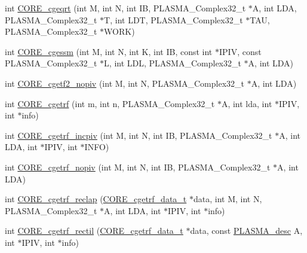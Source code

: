\begin{DoxyCompactItemize}
\item 
int \hyperlink{group__CORE__PLASMA__Complex32__t_gaf5772c310721f743a07d003e0b9b693e_gaf5772c310721f743a07d003e0b9b693e}{C\+O\+R\+E\+\_\+cgeqrt} (int M, int N, int I\+B, P\+L\+A\+S\+M\+A\+\_\+\+Complex32\+\_\+t $\ast$A, int L\+D\+A, P\+L\+A\+S\+M\+A\+\_\+\+Complex32\+\_\+t $\ast$T, int L\+D\+T, P\+L\+A\+S\+M\+A\+\_\+\+Complex32\+\_\+t $\ast$T\+A\+U, P\+L\+A\+S\+M\+A\+\_\+\+Complex32\+\_\+t $\ast$W\+O\+R\+K)
\item 
int \hyperlink{group__CORE__PLASMA__Complex32__t_ga4231da0e918e1dff4a6d270768e4d4dd_ga4231da0e918e1dff4a6d270768e4d4dd}{C\+O\+R\+E\+\_\+cgessm} (int M, int N, int K, int I\+B, const int $\ast$I\+P\+I\+V, const P\+L\+A\+S\+M\+A\+\_\+\+Complex32\+\_\+t $\ast$L, int L\+D\+L, P\+L\+A\+S\+M\+A\+\_\+\+Complex32\+\_\+t $\ast$A, int L\+D\+A)
\item 
int \hyperlink{group__CORE__PLASMA__Complex32__t_ga30476f667dedd4e77048b05c5f99a194_ga30476f667dedd4e77048b05c5f99a194}{C\+O\+R\+E\+\_\+cgetf2\+\_\+nopiv} (int M, int N, P\+L\+A\+S\+M\+A\+\_\+\+Complex32\+\_\+t $\ast$A, int L\+D\+A)
\item 
int \hyperlink{group__CORE__PLASMA__Complex32__t_ga1422c76f05c86e514fe638818a170e5f_ga1422c76f05c86e514fe638818a170e5f}{C\+O\+R\+E\+\_\+cgetrf} (int m, int n, P\+L\+A\+S\+M\+A\+\_\+\+Complex32\+\_\+t $\ast$A, int lda, int $\ast$I\+P\+I\+V, int $\ast$info)
\item 
int \hyperlink{group__CORE__PLASMA__Complex32__t_gafc300bd10ce70d8d864ce0408cc9cd6b_gafc300bd10ce70d8d864ce0408cc9cd6b}{C\+O\+R\+E\+\_\+cgetrf\+\_\+incpiv} (int M, int N, int I\+B, P\+L\+A\+S\+M\+A\+\_\+\+Complex32\+\_\+t $\ast$A, int L\+D\+A, int $\ast$I\+P\+I\+V, int $\ast$I\+N\+F\+O)
\item 
int \hyperlink{group__CORE__PLASMA__Complex32__t_gabd3a609b34e1e5cab320c21cfe5af6ca_gabd3a609b34e1e5cab320c21cfe5af6ca}{C\+O\+R\+E\+\_\+cgetrf\+\_\+nopiv} (int M, int N, int I\+B, P\+L\+A\+S\+M\+A\+\_\+\+Complex32\+\_\+t $\ast$A, int L\+D\+A)
\item 
int \hyperlink{group__CORE__PLASMA__Complex32__t_gaafeafd6a5addac900db7b17527269a6f_gaafeafd6a5addac900db7b17527269a6f}{C\+O\+R\+E\+\_\+cgetrf\+\_\+reclap} (\hyperlink{structCORE__cgetrf__data__s}{C\+O\+R\+E\+\_\+cgetrf\+\_\+data\+\_\+t} $\ast$data, int M, int N, P\+L\+A\+S\+M\+A\+\_\+\+Complex32\+\_\+t $\ast$A, int L\+D\+A, int $\ast$I\+P\+I\+V, int $\ast$info)
\item 
int \hyperlink{group__CORE__PLASMA__Complex32__t_gad10a4a025b034860079a83bc8bc38fc6_gad10a4a025b034860079a83bc8bc38fc6}{C\+O\+R\+E\+\_\+cgetrf\+\_\+rectil} (\hyperlink{structCORE__cgetrf__data__s}{C\+O\+R\+E\+\_\+cgetrf\+\_\+data\+\_\+t} $\ast$data, const \hyperlink{structplasma__desc__t}{P\+L\+A\+S\+M\+A\+\_\+desc} A, int $\ast$I\+P\+I\+V, int $\ast$info)

\end{DoxyCompactItemize}
